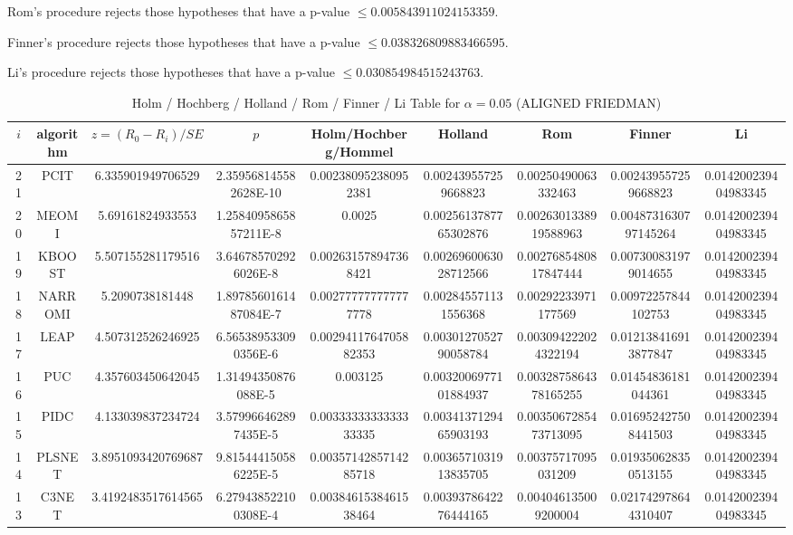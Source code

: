 \documentclass[a4paper,10pt]{article}
\begin{document}
\begin{landscape}
Rom's procedure rejects those hypotheses that have a p-value $\le0.005843911024153359$.


Finner's procedure rejects those hypotheses that have a p-value $\le0.038326809883466595$.


Li's procedure rejects those hypotheses that have a p-value $\le0.030854984515243763$.



\newpage

\begin{table}[!htp]
\centering\scriptsize
\caption{Holm / Hochberg / Holland / Rom / Finner / Li Table for $\alpha=0.05$ (ALIGNED FRIEDMAN)}
\begin{tabular}{ccccccccc}
$i$&algorithm&$z=(R_0 - R_i)/SE$&$p$&Holm/Hochberg/Hommel&Holland&Rom&Finner&Li\\
\hline
21&PCIT&6.335901949706529&2.359568145582628E-10&0.002380952380952381&0.002439557259668823&0.00250490063332463&0.002439557259668823&0.014200239404983345\\
20&MEOMI&5.69161824933553&1.2584095865857211E-8&0.0025&0.0025613787765302876&0.0026301338919588963&0.0048731630797145264&0.014200239404983345\\
19&KBOOST&5.507155281179516&3.646785702926026E-8&0.002631578947368421&0.0026960063028712566&0.0027685480817847444&0.007300831979014655&0.014200239404983345\\
18&NARROMI&5.2090738181448&1.8978560161487084E-7&0.002777777777777778&0.002845571131556368&0.00292233971177569&0.00972257844102753&0.014200239404983345\\
17&LEAP&4.507312526246925&6.565389533090356E-6&0.0029411764705882353&0.0030127052790058784&0.003094222024322194&0.012138416913877847&0.014200239404983345\\
16&PUC&4.357603450642045&1.31494350876088E-5&0.003125&0.0032006977101884937&0.0032875864378165255&0.01454836181044361&0.014200239404983345\\
15&PIDC&4.133039837234724&3.579966462897435E-5&0.0033333333333333335&0.0034137129465903193&0.0035067285473713095&0.016952427508441503&0.014200239404983345\\
14&PLSNET&3.8951093420769687&9.815444150586225E-5&0.0035714285714285718&0.0036571031913835705&0.00375717095031209&0.019350628350513155&0.014200239404983345\\
13&C3NET&3.4192483517614565&6.279438522100308E-4&0.0038461538461538464&0.0039378642276444165&0.004046135009200004&0.021742978644310407&0.014200239404983345\\

\end{tabular}
\end{table}
\end{landscape}
\end{document}
